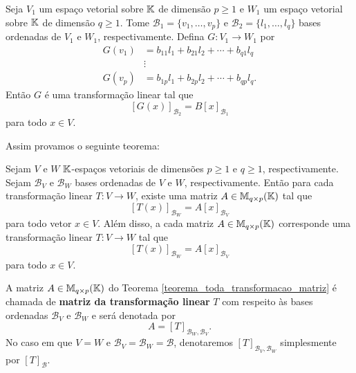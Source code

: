 Seja $V_1$ um espaço vetorial sobre $\mathbb{K}$ de dimensão $p \ge 1$ e $W_1$ um espaço vetorial sobre $\mathbb{K}$ de dimensão $q \ge 1$. Tome $\mathcal{B}_1 = \{v_1,\dots,v_p\}$ e $\mathcal{B}_2 = \{l_1,\dots,l_q\}$ bases ordenadas de $V_1$ e $W_1$, respectivamente. Defina $G \colon V_1 \to W_1$ por
\begin{align*}
    G(v_1) &= b_{11}l_1 + b_{21}l_2 + \cdots + b_{q1}l_q\\
    &\vdots\\
    G(v_p) &= b_{1p}l_1 + b_{2p}l_2 + \cdots + b_{qp}l_q.
\end{align*}
Então $G$ é uma transformação linear tal que
\[
    [G(x)]_{\mathcal{B}_2} = B[x]_{\mathcal{B}_1}
\]
para todo $x \in V$.

Assim provamos o seguinte teorema:
\begin{teorema}\label{teorema_toda_transformacao_matriz}
    Sejam $V$ e $W$ $\mathbb{K}$-espaços vetoriais de dimensões $p \ge 1$ e $q \ge 1$, respectivamente. Sejam $\mathcal{B}_V$ e $\mathcal{B}_W$ bases ordenadas de $V$ e $W$, respectivamente. Então para cada transformação linear $T \colon V \to W$, existe uma matriz $A \in \mathbb{M}_{q\times p}(\mathbb{K})$ tal que
    \[
        [T(x)]_{\mathcal{B}_W} = A[x]_{\mathcal{B}_V}
    \]
    para todo vetor $x \in V$. Além disso, a cada matriz $A \in \mathbb{M}_{q\times p}(\mathbb{K})$ corresponde uma transformação linear $T \colon V \to W$ tal que
    \[
        [T(x)]_{\mathcal{B}_W} = A[x]_{\mathcal{B}_V}
    \]
    para todo $x \in V$.
\end{teorema}

\begin{definicao}
    A matriz $A \in \mathbb{M}_{q\times p}(\mathbb{K})$ do Teorema \ref{teorema_toda_transformacao_matriz} é chamada de \textbf{matriz da transformação linear} $T$ com respeito às bases ordenadas $\mathcal{B}_V$ e $\mathcal{B}_W$ e será denotada por
    \[
        A = [T]_{\mathcal{B}_{W},\mathcal{B}_{V}}.
    \]
    No caso em que $V = W$ e $\mathcal{B}_V = \mathcal{B}_W = \mathcal{B}$, denotaremos $[T]_{\mathcal{B}_{V},\mathcal{B}_{W}}$ simplesmente por $[T]_\mathcal{B}$.
\end{definicao}

